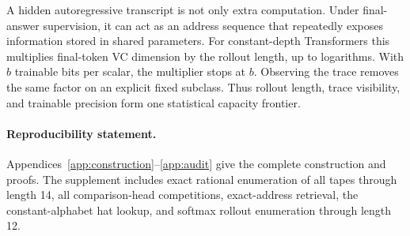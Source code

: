 \documentclass{article}
\newcommand{\1}{\mathbf 1}
\begin{document}
A hidden autoregressive transcript is not only extra computation. Under final-answer supervision, it can act as an address sequence that repeatedly exposes information stored in shared parameters. For constant-depth Transformers this multiplies final-token VC dimension by the rollout length, up to logarithms. With $b$ trainable bits per scalar, the multiplier stops at $b$. Observing the trace removes the same factor on an explicit fixed subclass. Thus rollout length, trace visibility, and trainable precision form one statistical capacity frontier.

\paragraph{Reproducibility statement.}
Appendices~\ref{app:construction}--\ref{app:audit} give the complete construction and proofs. The supplement includes exact rational enumeration of all tapes through length 14, all comparison-head competitions, exact-address retrieval, the constant-alphabet hat lookup, and softmax rollout enumeration through length 12.





\end{document}
